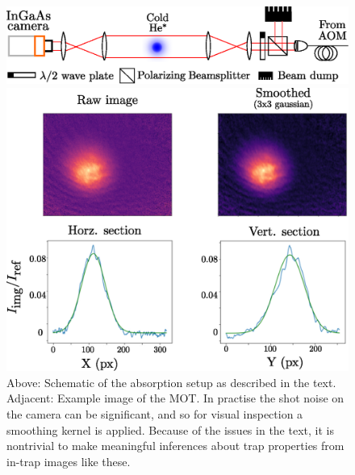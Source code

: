 	\begin{figure}
	\includegraphics[width=\textwidth]{fig/lattice/abs_img}
	\begin{minipage}{0.45\textwidth}
	\vspace{0pt}
		\caption{ Above: Schematic of the absorption setup as described in the text.
		Adjacent: 
		Example image of the MOT.
		In practise the shot noise on the camera can be significant, and so for visual inspection a smoothing kernel is applied.
		Because of the issues in the text, it is nontrivial to make meaningful inferences about trap properties from in-trap images like these.}
		\label{fig:abs_img}
		\end{minipage}
		\hfill
		\begin{minipage}{0.54\textwidth}
	    \vspace{0pt}
	    \includegraphics[width=\textwidth]{fig/lattice/20170606_CMOT_img}
	    \end{minipage}
	\end{figure}
